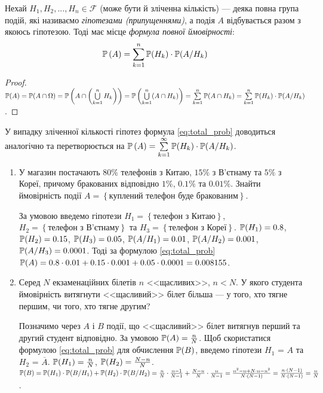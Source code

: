 Нехай $H_1, H_2, ..., H_n \in \mathcal{F}$ (може бути й зліченна кількість) --- деяка повна група подій,
які називаємо \emph{гіпотезами (припущеннями)}, а подія $A$ відбувається разом з якоюсь гіпотезою. Тоді має місце
\emph{формула повної ймовірності}:
\begin{equation}\label{eq:total_prob}
    \P\left( A \right) = \sum\limits_{k=1}^n \P(H_k)\cdot \P(A/H_k)
\end{equation}
\begin{proof}
    $\P(A) = \P(A \cap \Omega) = \P\left(A \cap \left(\bigcup\limits_{k=1}^n H_k\right)\right) = \P\left(\bigcup\limits_{k=1}^n (A\cap H_k)\right) = \sum\limits_{k=1}^n \P(A\cap H_k) = \sum\limits_{k=1}^n \P(H_k)\cdot \P(A/H_k)$.
\end{proof}
У випадку зліченної кількості гіпотез формула \eqref{eq:total_prob} доводиться аналогічно та перетворюється
на $\P\left( A \right) = \sum\limits_{k=1}^{\infty} \P(H_k)\cdot \P(A/H_k)$.

\begin{example}
    \begin{enumerate}
        \item У магазин постачають $80\%$ телефонів з Китаю, $15\%$ з В'єтнаму та $5\%$ з Кореї,
        причому бракованих відповідно $1\%$, $0.1\%$ та $0.01\%$.
        Знайти ймовірність події $A = \left\{ \text{куплений телефон буде бракованим}\right\}$.

        За умовою введемо гіпотези $H_1 = \left\{ \text{телефон з Китаю}\right\}$,
        $H_2 = \left\{ \text{телефон з В'єтнаму}\right\}$ та $H_3 = \left\{ \text{телефон з Кореї}\right\}$.
        $\P(H_1) = 0.8$, $\P(H_2) = 0.15$, $\P(H_3) = 0.05$,
        $\P(A/H_1) = 0.01$, $\P(A/H_2) = 0.001$, $\P(A/H_3) = 0.0001$.
        Тоді за формулою \eqref{eq:total_prob} $\P(A) = 0.8\cdot 0.01 + 0.15\cdot 0.001 + 0.05\cdot 0.0001 = 0.008155$.
        \item Серед $N$ екзаменаційних білетів $n$ <<щасливих>>, $n<N$.
        У якого студента ймовірність витягнути <<щасливий>> білет більша --- у того, хто тягне першим, чи того, хто тягне другим?

        Позначимо через $A$ і $B$ події, що <<щасливий>> білет витягнув перший та другий студент відповідно. За умовою $\P(A) = \frac{n}{N}$.
        Щоб скористатися формулою \eqref{eq:total_prob} для обчислення $\P(B)$, введемо гіпотези $H_1$ = $A$ та $H_2$ = $\overline{A}$.
        $\P(H_1) = \frac{n}{N}$, $\P(H_2) = \frac{N-n}{N}$.
        \\ $\P(B) = \P(H_1)\cdot \P(B/H_1) + \P(H_2)\cdot \P(B/H_2) = \frac{n}{N}\cdot \frac{n-1}{N-1} + \frac{N-n}{N}\cdot \frac{n}{N-1} = 
        \frac{n^2 - n + N\cdot n - n^2}{N\cdot(N-1)} = \frac{n\cdot (N-1)}{N\cdot(N-1)} = \frac{n}{N}$.
    \end{enumerate}
\end{example}

